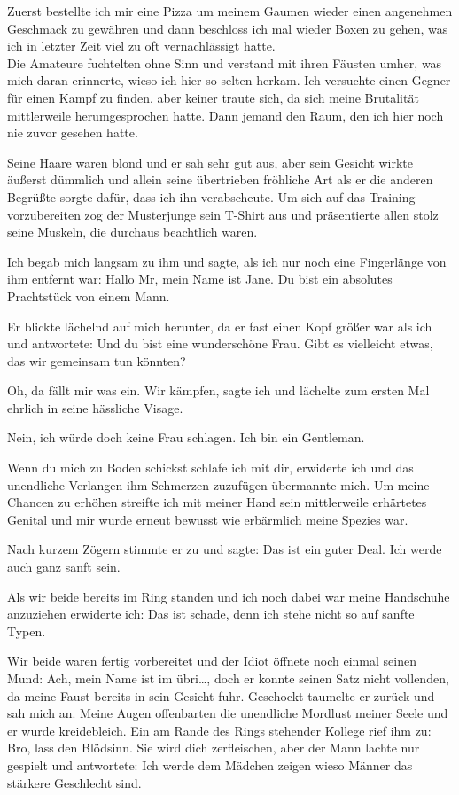\documentclass[11pt, a5paper]{article}
\newcommand{\Te}{Jane} %
\begin{document}
\begin{spacing}{1.2}
		Zuerst bestellte ich mir eine Pizza um meinem Gaumen wieder einen angenehmen Geschmack zu gewähren und dann beschloss ich mal wieder Boxen zu gehen, was ich in letzter Zeit viel zu oft vernachlässigt hatte.\\
		
		Die Amateure fuchtelten ohne Sinn und verstand mit ihren Fäusten umher, was mich daran erinnerte, wieso ich hier so selten herkam. Ich versuchte einen Gegner für einen Kampf zu finden, aber keiner traute sich, da sich meine Brutalität mittlerweile herumgesprochen hatte. Dann jemand den Raum, den ich hier noch nie zuvor gesehen hatte.
		
		Seine Haare waren blond und er sah sehr gut aus, aber sein Gesicht wirkte äußerst dümmlich und allein seine übertrieben fröhliche Art als er die anderen Begrüßte sorgte dafür, dass ich ihn verabscheute. Um sich auf das Training vorzubereiten zog der Musterjunge sein T-Shirt aus und präsentierte allen stolz seine Muskeln, die durchaus beachtlich waren.
		
		Ich begab mich langsam zu ihm und sagte, als ich nur noch eine Fingerlänge von ihm entfernt war: \frqq Hallo Mr, mein Name ist \Te . Du bist ein absolutes Prachtstück von einem Mann.\flqq
		
		Er blickte lächelnd auf mich herunter, da er fast einen Kopf größer war als ich und antwortete: \frqq Und du bist eine wunderschöne Frau. Gibt es vielleicht etwas, das wir gemeinsam tun könnten?\flqq
		
		\frqq Oh, da fällt mir was ein. Wir kämpfen\flqq , sagte ich und lächelte zum ersten Mal ehrlich in seine hässliche Visage.
		
		\frqq Nein, ich würde doch keine Frau schlagen. Ich bin ein Gentleman.\flqq
		
		\frqq Wenn du mich zu Boden schickst schlafe ich mit dir\flqq , erwiderte ich und das unendliche Verlangen ihm Schmerzen zuzufügen übermannte mich. Um meine Chancen zu erhöhen streifte ich mit meiner Hand sein mittlerweile erhärtetes Genital und mir wurde erneut bewusst wie erbärmlich meine Spezies war.
		
		Nach kurzem Zögern stimmte er zu und sagte: \frqq Das ist ein guter Deal. Ich werde auch ganz sanft sein.\flqq
		
		Als wir beide bereits im Ring standen und ich noch dabei war meine Handschuhe anzuziehen erwiderte ich: \frqq Das ist schade, denn ich stehe nicht so auf sanfte Typen.\flqq
		
		Wir beide waren fertig vorbereitet und der Idiot öffnete noch einmal seinen Mund: \frqq Ach, mein Name ist im übri…\flqq, doch er konnte seinen Satz nicht vollenden, da meine Faust bereits in sein Gesicht fuhr. Geschockt taumelte er zurück und sah mich an. Meine Augen offenbarten die unendliche Mordlust meiner Seele und er wurde kreidebleich. Ein am Rande des Rings stehender Kollege rief ihm zu: \frqq Bro, lass den Blödsinn. Sie wird dich zerfleischen\flqq , aber der Mann lachte nur gespielt und antwortete: \frqq Ich werde dem Mädchen zeigen wieso Männer das stärkere Geschlecht sind.\flqq
		

\end{spacing}
\end{document}
